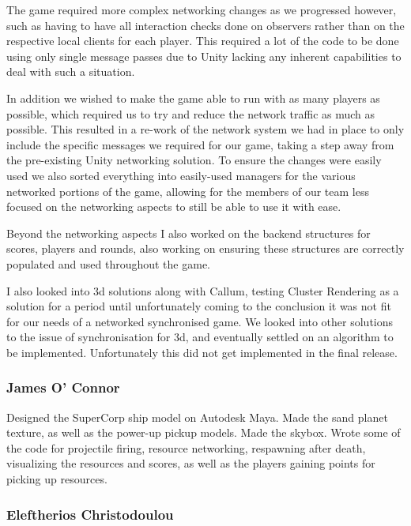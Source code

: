 \documentclass[11pt,a4paper]{article}
\begin{document}
        The game required more complex networking changes as we progressed however, such as having to have all interaction checks done on observers rather than on the respective local clients for each player. This required a lot of the code to be done using only single message passes due to Unity lacking any inherent capabilities to deal with such a situation.

        In addition we wished to make the game able to run with as many players as possible, which required us to try and reduce the network traffic as much as possible. This resulted in a re-work of the network system we had in place to only include the specific messages we required for our game, taking a step away from the pre-existing Unity networking solution. To ensure the changes were easily used we also sorted everything into easily-used managers for the various networked portions of the game, allowing for the members of our team less focused on the networking aspects to still be able to use it with ease.

        Beyond the networking aspects I also worked on the backend structures for scores, players and rounds, also working on ensuring these structures are correctly populated and used throughout the game.

        I also looked into 3d solutions along with Callum, testing Cluster Rendering as a solution for a period until unfortunately coming to the conclusion it was not fit for our needs of a networked synchronised game. We looked into other solutions to the issue of synchronisation for 3d, and eventually settled on an algorithm to be implemented. Unfortunately this did not get implemented in the final release.

        \subsubsection{James O’ Connor}

        Designed the SuperCorp ship model on Autodesk Maya. Made the sand planet texture, as well as the power-up pickup models. Made the skybox. Wrote some of the code for projectile firing, resource networking, respawning after death, visualizing the resources and scores, as well as the players gaining points for picking up resources.




        \subsubsection{Eleftherios Christodoulou}
\end{document}
